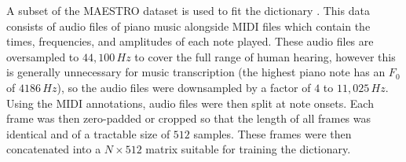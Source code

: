 A subset of the MAESTRO dataset is used to fit the dictionary \cite{hawthorne_enabling_2019}. This data consists of audio files of piano music alongside \ac{MIDI} files which contain the times, frequencies, and amplitudes of each note played. These audio files are oversampled to $44,100\,Hz$  to cover the full range of human hearing, however this is  generally unnecessary for music transcription (the highest piano note has an $F_0$ of $4186\,Hz$), so the audio files were downsampled by a factor of $4$ to $11,025\,Hz$. Using the \ac{MIDI} annotations, audio files were then split at note onsets. Each frame was then zero-padded or cropped so that the length of all frames was identical and of a tractable size of $512$ samples. These frames were then concatenated into a $N\times 512$ matrix suitable for training the dictionary.
